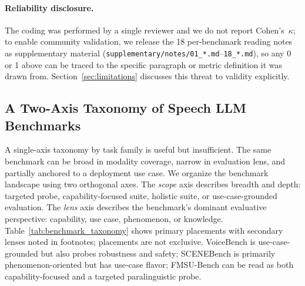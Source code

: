 \paragraph{Reliability disclosure.}
The coding was performed by a single reviewer and we do not report
Cohen's~$\kappa$; to enable community validation, we release the 18
per-benchmark reading notes as supplementary material
(\texttt{supplementary/notes/01\_*.md}--\texttt{18\_*.md}), so any 0
or 1 above can be traced to the specific paragraph or metric
definition it was drawn from. Section~\ref{sec:limitations} discusses
this threat to validity explicitly.

\subsection{A Two-Axis Taxonomy of Speech LLM Benchmarks}
\label{subsec:eval_taxonomy}

A single-axis taxonomy by task family is useful but insufficient. The same
benchmark can be broad in modality coverage, narrow in evaluation lens, and
partially anchored to a deployment use case. We organize the benchmark
landscape using two orthogonal axes. The \emph{scope} axis describes
breadth and depth: targeted probe, capability-focused suite, holistic
suite, or use-case-grounded evaluation. The \emph{lens} axis describes the
benchmark's dominant evaluative perspective: capability, use case,
phenomenon, or knowledge. Table~\ref{tab:benchmark_taxonomy} shows primary
placements with secondary lenses noted in footnotes; placements are not
exclusive. VoiceBench is use-case-grounded but also probes robustness and
safety; SCENEBench is primarily phenomenon-oriented but has use-case
flavor; FMSU-Bench can be read as both capability-focused and a targeted
paralinguistic probe.

